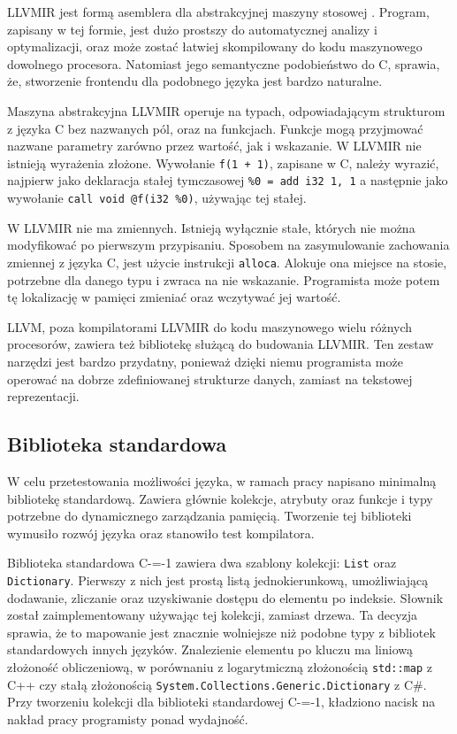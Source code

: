 LLVMIR jest formą asemblera dla abstrakcyjnej maszyny stosowej \cite{llvmir}.
Program, zapisany w tej formie, jest dużo prostszy do automatycznej analizy i optymalizacji, oraz może zostać łatwiej skompilowany do kodu maszynowego dowolnego procesora.
Natomiast jego semantyczne podobieństwo do C, sprawia, że, stworzenie frontendu dla podobnego języka jest bardzo naturalne.

Maszyna abstrakcyjna LLVMIR operuje na typach, odpowiadającym strukturom z języka C bez nazwanych pól, oraz na funkcjach.
Funkcje mogą przyjmować nazwane parametry zarówno przez wartość, jak i wskazanie.
W LLVMIR nie istnieją wyrażenia złożone.
Wywołanie \lstinline{f(1 + 1)}, zapisane w C, należy wyrazić, najpierw jako deklaracja stałej tymczasowej \lstinline{%0 = add i32 1, 1} a następnie jako wywołanie \lstinline{call void @f(i32 %0)}, używając tej stałej.

W LLVMIR nie ma zmiennych.
Istnieją wyłącznie stałe, których nie można modyfikować po pierwszym przypisaniu.
Sposobem na zasymulowanie zachowania zmiennej z języka C, jest użycie instrukcji \lstinline{alloca}.
Alokuje ona miejsce na stosie, potrzebne dla danego typu i zwraca na nie wskazanie.
Programista może potem tę lokalizację w pamięci zmieniać oraz wczytywać jej wartość.

LLVM, poza kompilatorami LLVMIR do kodu maszynowego wielu różnych procesorów, zawiera też bibliotekę służącą do budowania LLVMIR.
Ten zestaw narzędzi jest bardzo przydatny, ponieważ dzięki niemu programista może operować na dobrze zdefiniowanej strukturze danych, zamiast na tekstowej reprezentacji.

\subsection{Biblioteka standardowa}

W celu przetestowania możliwości języka, w ramach pracy napisano minimalną bibliotekę standardową.
Zawiera głównie kolekcje, atrybuty oraz funkcje i typy potrzebne do dynamicznego zarządzania pamięcią.
Tworzenie tej biblioteki wymusiło rozwój języka oraz stanowiło test kompilatora.

Biblioteka standardowa C-=-1 zawiera dwa szablony kolekcji: \lstinline{List} oraz \lstinline{Dictionary}.
Pierwszy z nich jest prostą listą jednokierunkową, umożliwiającą dodawanie, zliczanie oraz uzyskiwanie dostępu do elementu po indeksie.
Słownik został zaimplementowany używając tej kolekcji, zamiast drzewa.
Ta decyzja sprawia, że to mapowanie jest znacznie wolniejsze niż podobne typy z bibliotek standardowych innych języków.
Znalezienie elementu po kluczu ma liniową złożoność obliczeniową, w porównaniu z logarytmiczną złożonością \lstinline{std::map} z C++ czy stałą złożonością \lstinline{System.Collections.Generic.Dictionary} z C\#.
Przy tworzeniu kolekcji dla biblioteki standardowej C-=-1, kładziono nacisk na nakład pracy programisty ponad wydajność.

